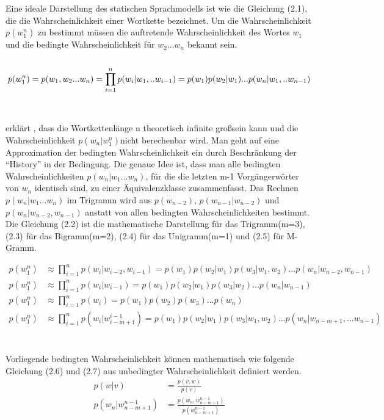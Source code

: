 Eine ideale Darstellung des statischen Sprachmodells ist wie die Gleichung (2.1), die die Wahrscheinlichkeit einer Wortkette bezeichnet. Um die Wahrscheinlichkeit $p(w_{1}^n)$ zu bestimmt m\"ussen die auftretende Wahrscheinlichkeit des Wortes $w_{1}$ und die bedingte Wahrscheinlichkeit f\"ur $w_{2}...w_{n}$ bekannt sein.
\\
\\
\begin{equation}
p(w_{1}^n) = p(w_{1},w_{2}...w_{n}) = \prod_{i=1}^n p(w_{i}|w_{1},..w_{i-1}) \\
= p(w_{1})p(w_{2}|w_{1})...p(w_{n}|w_{1},..w_{n-1})
\end{equation}
\\
\\
\cite{book_speech} erkl\"art , dass die Wortkettenl\"ange n theoretisch infinite gro\ss sein kann und die Wahrscheinlichkeit $p(w_{n}|w_{1}^n)$nicht berechenbar wird. Man geht auf eine Approximation der bedingten Wahrscheinlichkeit ein durch Beschr\"ankung der "`History"' in der Bedingung. Die genaue Idee ist, dass man alle bedingten Wahrscheinlichkeiten $p(w_{n}|w_{1}...w_{n})$, f\"ur die die letzten m-1 Vorg\"angerw\"orter von $w_{n}$ identisch sind, zu einer \"Aquivalenzklasse zusammenfasst. Das Rechnen $p(w_{n}|w_{1}...w_{n})$ im Trigramm wird aus $p(w_{n-2})$, $p(w_{n-1}|w_{n-2})$ und $p(w_{n}|w_{n-2},w_{n-1})$ anstatt von allen bedingten Wahrscheinlichkeiten bestimmt. 
Die Gleichung (2.2) ist die mathematische Darstellung f\"ur das Trigramm(m=3), (2.3) f\"ur das Bigramm(m=2), (2.4) f\"ur das Unigramm(m=1) und (2.5) f\"ur M-Gramm.

\begin{align}
p(w_{1}^n) & \approx \prod_{i=1}^n p(w_{i}|w_{i-2},w_{i-1})=p(w_{1})p(w_{2}|w_{1})p(w_{3}|w_{1},w_{2})...p(w_{n}|w_{n-2},w_{n-1}) \\
p(w_{1}^n) & \approx \prod_{i=1}^n p(w_{i}|w_{i-1})=p(w_{1})p(w_{2}|w_{1})p(w_{3}|w_{2})...p(w_{n}|w_{n-1}) \\
p(w_{1}^n) & \approx \prod_{i=1}^n p(w_{i})=p(w_{1})p(w_{2})p(w_{3})...p(w_{n})\\
p(w_{1}^n) & \approx \prod_{i=1}^n p(w_{i}|w_{i-m+1}^{i-1})=p(w_{1})p(w_{2}|w_{1})p(w_{3}|w_{1},w_{2})...p(w_{n}|w_{n-m+1},...w_{n-1})
\end{align}
\\
\\
Vorliegende bedingten Wahrscheinlichkeit k\"onnen mathematisch wie folgende Gleichung (2.6) und (2.7)  aus unbedingter Wahrscheinlichkeit definiert werden.
\begin{align}
p(w|v) &=\frac{p(v,w)}{p(v)} \\
p(w_{n}|w_{n-m+1}^{n-1}) &=\frac{p(w_{n},w_{n-m+1}^{n-1} )}{p(w_{n-m+1}^{n-1})} 
\end{align}


